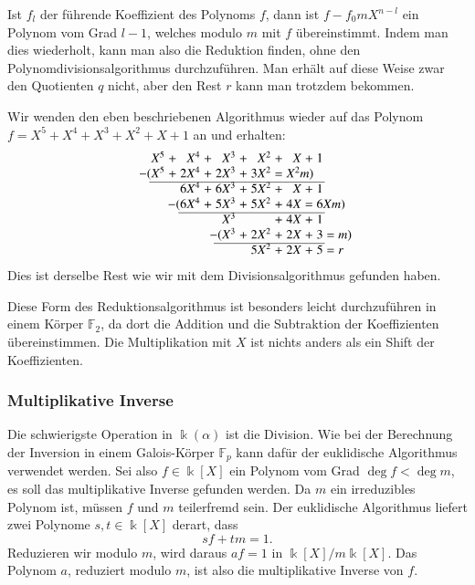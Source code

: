 Ist $f_l$ der führende Koeffizient des Polynoms $f$, dann ist
$f-f_0mX^{n-l}$ ein Polynom vom Grad $l-1$, welches modulo $m$
mit $f$ übereinstimmt.
Indem man dies wiederholt, kann man also die Reduktion finden, ohne
den Polynomdivisionsalgorithmus durchzuführen.
Man erhält auf diese Weise zwar den Quotienten $q$ nicht, aber den
Rest $r$ kann man trotzdem bekommen.

\begin{beispiel}
Wir wenden den eben beschriebenen Algorithmus wieder auf das
Polynom $f=X^5+X^4+X^3+X^2+X+1$ an und erhalten:
\[
\arraycolsep=1.4pt
\begin{array}{rcrcrcrcrcr}
X^5&+& X^4&+& X^3&+& X^2&+& X&+&1\\
\llap{$-($}X^5&+&2X^4&+&2X^3&+&3X^2\rlap{$\mathstrut =X^2m)$}& &  & & \\
\cline{1-11}
   & &6X^4&+&6X^3&+&5X^2&+& X&+&1\\
   & &\llap{$-($}6X^4&+&5X^3&+&5X^2&+&4X\rlap{$\mathstrut =6Xm)$}& & \\
\cline{3-11}
   & &    & & X^3& &    &+&4X&+&1\\
   & &    & & \llap{$-($}X^3&+&2X^2&+&2X&+&3\rlap{$\mathstrut =m)$}\\
\cline{5-11}
   & &    & &    & &5X^2&+&2X&+&5\rlap{$\mathstrut =r$}\\
\end{array}
\]
Dies ist derselbe Rest wie wir mit dem Divisionsalgorithmus
gefunden haben.
\end{beispiel}

Diese Form des Reduktionsalgorithmus ist besonders leicht durchzuführen
in einem Körper $\mathbb{F}_2$, da dort die Addition und die Subtraktion
der Koeffizienten übereinstimmen.
Die Multiplikation mit $X$ ist nichts anders als ein Shift der
Koeffizienten.

\subsubsection{Multiplikative Inverse}
Die schwierigste Operation in $\Bbbk(\alpha)$ ist die Division.
Wie bei der Berechnung der Inversion in einem Galois-Körper $\mathbb{F}_p$
kann dafür der euklidische Algorithmus verwendet werden.
Sei also $f\in\Bbbk[X]$ ein Polynom vom Grad $\deg f <\deg m$, es soll
das multiplikative Inverse gefunden werden.
Da $m$ ein irreduzibles Polynom ist, müssen $f$ und $m$ teilerfremd sein.
Der euklidische Algorithmus liefert zwei Polynome $s,t\in\Bbbk[X]$ derart,
dass
\[
sf+tm=1.
\]
Reduzieren wir modulo $m$, wird daraus $af=1$ in $\Bbbk[X]/m\Bbbk[X]$.
Das Polynom $a$, reduziert modulo $m$, ist also die multiplikative
Inverse von $f$.

